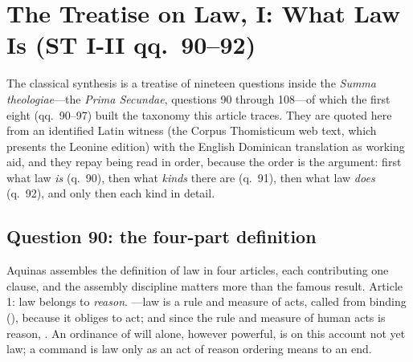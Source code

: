 \section{The Treatise on Law, I: What Law Is (ST I-II qq.~90--92)}

The classical synthesis is a treatise of nineteen questions inside the \emph{Summa theologiae}---the \emph{Prima Secundae}, questions 90 through 108---of which the first eight (qq.~90--97) built the taxonomy this article traces. They are quoted here from an identified Latin witness (the Corpus Thomisticum web text, which presents the Leonine edition) with the English Dominican translation as working aid, and they repay being read in order, because the order is the argument: first what law \emph{is} (q.~90), then what \emph{kinds} there are (q.~91), then what law \emph{does} (q.~92), and only then each kind in detail.

\subsection{Question 90: the four-part definition}

Aquinas assembles the definition of law in four articles, each contributing one clause, and the assembly discipline matters more than the famous result. Article 1: law belongs to \emph{reason}. ---law is a rule and measure of acts, called  from binding (), because it obliges to act; and since the rule and measure of human acts is reason, . An ordinance of will alone, however powerful, is on this account not yet law; a command is law only as an act of reason ordering means to an end.


